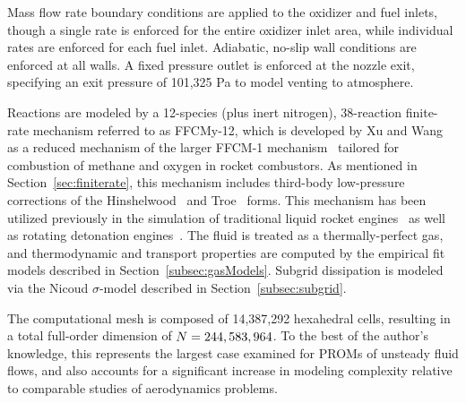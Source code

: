 Mass flow rate boundary conditions are applied to the oxidizer and fuel inlets, though a single rate is enforced for the entire oxidizer inlet area, while individual rates are enforced for each fuel inlet. Adiabatic, no-slip wall conditions are enforced at all walls. A fixed pressure outlet is enforced at the nozzle exit, specifying an exit pressure of 101,325 Pa to model venting to atmosphere.

Reactions are modeled by a 12-species (plus inert nitrogen), 38-reaction finite-rate mechanism referred to as FFCMy-12, which is developed by Xu and Wang~\cite{Wang2018,Xu2018} as a reduced mechanism of the larger FFCM-1 mechanism~\cite{ffcm1} tailored for combustion of methane and oxygen in rocket combustors. As mentioned in Section~\ref{sec:finiterate}, this mechanism includes third-body low-pressure corrections of the Hinshelwood~\cite{Hinshelwood1926} and Troe~\cite{Gilbert1983} forms. This mechanism has been utilized previously in the simulation of traditional liquid rocket engines~\cite{Harvazinski2020,Harvazinski2021} as well as rotating detonation engines~\cite{Prakash2021,Batista2021}. The fluid is treated as a thermally-perfect gas, and thermodynamic and transport properties are computed by the empirical fit models described in Section~\ref{subsec:gasModels}. Subgrid dissipation is modeled via the Nicoud $\sigma$-model described in Section~\ref{subsec:subgrid}.

The computational mesh is composed of 14,387,292 hexahedral cells, resulting in a total full-order dimension of $N = 244,583,964$. To the best of the author's knowledge, this represents the largest case examined for PROMs of unsteady fluid flows, and also accounts for a significant increase in modeling complexity relative to comparable studies of aerodynamics problems.

